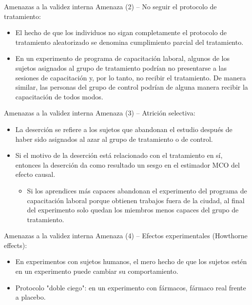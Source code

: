 \documentclass[11pt, aspectratio=169, compress]{beamer}
\begin{document}
\begin{frame}{Amenazas a la validez interna}
	Amenaza (2) -- No seguir el protocolo de tratamiento:
	
	\begin{itemize}
		\item El hecho de que los individuos no sigan completamente el protocolo de tratamiento aleatorizado se denomina cumplimiento parcial del tratamiento.
		\item En un experimento de programa de capacitación laboral, algunos de los sujetos asignados al grupo de tratamiento podrían no presentarse a las sesiones de capacitación y, por lo tanto, no recibir el tratamiento. De manera similar, las personas del grupo de control podrían de alguna manera recibir la capacitación de todos modos.
	\end{itemize}
\end{frame}
\begin{frame}{Amenazas a la validez interna}
	Amenaza (3) -- Atrición selectiva:
	\begin{itemize}
		\item La deserción se refiere a los sujetos que abandonan el estudio después de haber sido asignados al azar al grupo de tratamiento o de control.
		\item Si el motivo de la deserción está relacionado con el tratamiento en sí, entonces la deserción da como resultado un sesgo en el estimador MCO del efecto causal.
		
		\begin{itemize}
			\item Si los aprendices más capaces abandonan el experimento del programa de capacitación laboral porque obtienen trabajos fuera de la ciudad, al final del experimento solo quedan los miembros menos capaces del grupo de tratamiento.
		\end{itemize}
	\end{itemize}
\end{frame}
\begin{frame}{Amenazas a la validez interna}
	Amenaza (4) -- Efectos experimentales (Howthorne effects): 
	\begin{itemize}
		\item En experimentos con sujetos humanos, el mero hecho de que los sujetos estén en un experimento puede cambiar su comportamiento.
		\item Protocolo "doble ciego": en un experimento con fármacos, fármaco real frente a placebo.
	\end{itemize}
\end{frame}
\end{document}
